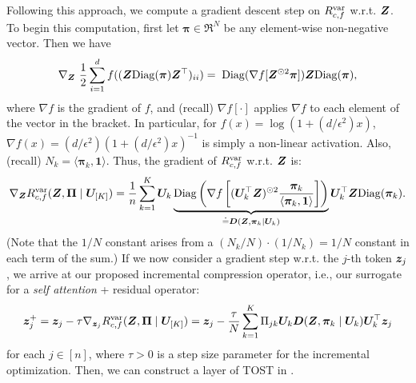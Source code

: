 \documentclass[../../book-main.tex]{subfiles}
\begin{document}
Following this approach, we compute a gradient descent step on $R_{c,f}^{\rm var}$ w.r.t. $\bm{Z}$.
To begin this computation, first let $\bm \pi \in \Re^N$ be any element-wise non-negative vector. Then we have
\begin{equation}\label{eq1:grad Rcf}
\nabla_{\Z} \ \frac{1}{2} \sum_{i = 1}^{d} f(  (\Z \mathrm{Diag}(\bm \pi) \Z^{\top} )_{ii}) %
= \; \mathrm{Diag}(\nabla f[ \Z^{\odot 2} \bm \pi] ) \Z \mathrm{Diag}(\bm \pi),
\end{equation}
%
where $\nabla f$ is the gradient of $f$, and (recall) $\nabla f[\cdot]$ applies $\nabla f$ to each element of the vector in the bracket. In particular, for $ f(x) = \log(1 + (d/\epsilon^{2}) x)$,  $\nabla f(x) = (d / \epsilon^{2}) (1+ (d / \epsilon^{2}) x)^{-1}$ is simply a non-linear activation. Also, (recall) $N_{k} = \langle \bm \pi_{k}, \bm 1\rangle$. Thus, the gradient of $R^{\rm var}_{c,f}$ w.r.t. $\bm{Z}$ is:
\begin{align}\label{eq2:grad Rcf}
    \nabla_{\bm{Z}} R^{\rm var}_{c,f}(\bm{Z},\bm \Pi \mid \bm U_{[K]}) =  \frac{1}{n} \sum_{k=1}^K \bm U_{k} \underbrace{\mathrm{Diag} \left( \nabla f\left[ (\bm U_{k}^{\top} \bm{Z})^{\odot 2}  \frac{\bm \pi_k}{\langle \bm \pi_{k}, \bm 1\rangle} \right] \right)}_{\doteq \bm D(\bm{Z}, \bm \pi_{k} \mid \bm U_{k})} \bm U_{k}^{\top} \bm{Z} \mathrm{Diag}(\bm \pi_k).
\end{align}
(Note that the $1/N$ constant arises from a $(N_{k}/N)\cdot (1/N_{k}) = 1/N$ constant in each term of the sum.) If we now consider a gradient step w.r.t. the $j$-th token $\bm{z}_j$
, we arrive at our proposed incremental compression operator, i.e., our surrogate for a \textit{self attention} + residual operator:
%
\vspace{-2mm}
\begin{equation}\label{eq:layer-operation-orig}
    \bm{z}_j^+ = \bm{z}_{j} - \tau \nabla_{\bm{z}_{j}}R_{c, f}^{\rm var}(\bm{Z}, \bm \Pi \mid \bm U_{[K]}) = \bm{z}_j - \frac{\tau}{N} \sum_{k=1}^K \Pi_{jk} \bm U_{k} \bm D(\bm{Z}, \bm \pi_{k} \mid \bm U_{k}) \bm U_{k}^{\top} \bm{z}_j
\end{equation}
for each \(j \in [n]\), where $\tau > 0$ is a step size parameter for the incremental optimization. Then, we can construct a layer of TOST in .  
\end{document}

